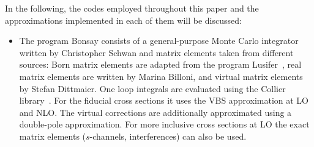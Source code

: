 In the following, the codes employed throughout this paper and the approximations implemented in each of them will be discussed:

\begin{itemize}

\item The program {\sc Bonsay} consists of a general-purpose Monte Carlo integrator written by Christopher Schwan and matrix elements taken from different sources:
Born matrix elements are adapted from the program {\sc Lusifer}~\cite{Dittmaier:2002ap}, real matrix elements are written by Marina Billoni, and virtual matrix elements by Stefan Dittmaier.
One loop integrals are evaluated using the {\sc Collier} library~\cite{Denner:2014gla,Denner:2016kdg}.
For the fiducial cross sections it uses the VBS approximation at LO and NLO.
The virtual corrections are additionally approximated using a double-pole approximation.
For more inclusive cross sections at LO the exact matrix elements ($s$-channels, interferences) can also be used.


\end{itemize}

